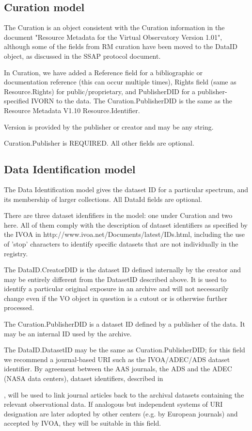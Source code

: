 \documentclass[11pt]{article}
\newcommand{\link}[1]{{\color{dblue}\htmladdnormallink{#1}{}\par}}
\begin{document}
\subsection{Curation model}

The Curation is an object consistent with the Curation information in
the document "Resource Metadata for the Virtual Observatory Version
1.01",
although some of the fields from RM curation have been moved to the DataID
object, as discussed in the SSAP protocol document.


In Curation, we have added a Reference field for a bibliographic or documentation
reference (this can occur multiple times), Rights field (same as Resource.Rights)
for public/proprietary, and PublisherDID
for a publisher-specified IVORN to the data. The Curation.PublisherDID
is the same as the Resource Metadata V1.10 Resource.Identifier.

Version is provided by the publisher or creator and may be any string.
 
Curation.Publisher is REQUIRED. All other
fields are optional.  


\subsection{Data Identification model}


The Data Identification model gives the dataset ID for a particular
spectrum, and its membership of larger collections.
All DataId fields are optional. 

There are three dataset idenfifiers in the model: one under Curation
and two here. All of them comply with the description of dataset identifiers
as specified by the IVOA in http://www.ivoa.net/Documents/latest/IDs.html,
including the use of 'stop' characters to identify specific datasets
that are not individually in the registry.
 
The DataID.CreatorDID is the dataset ID defined internally by
the creator and may be entirely different from the DatasetID described
above. It is used to identify a particular original exposure in an archive
and will not necessarily change even if the VO object in question is a cutout or
is otherwise further processed.

The Curation.PublisherDID is a dataset ID defined by a publisher
of the data. It may be an internal ID used by the archive.

The DataID.DatasetID may be the same as Curation.PublisherDID;
for this field we recommend a journal-based URI such
as the IVOA/ADEC/ADS dataset identifier.
By agreement between the AAS journals, the ADS and the ADEC (NASA data centers),
dataset identifiers, described in 
\link{http://vo.ads.harvard.edu/dv/},
will be used to link journal articles back
to the archival datasets containing the relevant observational data.
If analogous but independent systems of URI designation are later
adopted by other centers (e.g. by European journals) and accepted by IVOA,
they will be suitable in this field.
\end{document}
